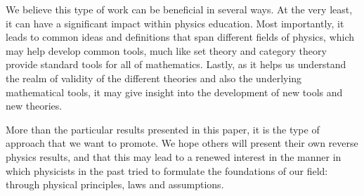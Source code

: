 \documentclass[10pt,twocolumn, nofootinbib]{revtex4-2}
\begin{document}
We believe this type of work can be beneficial in several ways. At the very least, it can have a significant impact within physics education. Most importantly, it leads to common ideas and definitions that span different fields of physics, which may help develop common tools, much like set theory and category theory provide standard tools for all of mathematics. Lastly, as it helps us understand the realm of validity of the different theories and also the underlying mathematical tools, it may give insight into the development of new tools and new theories.

More than the particular results presented in this paper, it is the type of approach that we want to promote. We hope others will present their own reverse physics results, and that this may lead to a renewed interest in the manner in which physicists in the past tried to formulate the foundations of our field: through physical principles, laws and assumptions.



\end{document}

